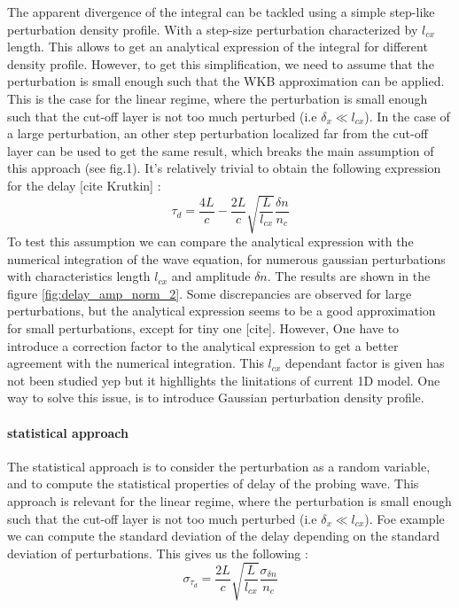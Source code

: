 \documentclass[11pt,a4paper]{report}
\begin{document}
\begin{multicols}{2}
    The apparent divergence of the integral can be tackled using a simple step-like perturbation density profile.
    With a step-size perturbation characterized by $l_{cx}$ length. This allows to get an analytical expression of the integral for different density profile. However, to get this simplification, we need to assume that the perturbation is small enough such that the WKB approximation can be applied.
    This is the case for the linear regime, where the perturbation is small enough such that the cut-off layer is not too much perturbed (i.e $\delta_x \ll l_{cx}$). In the case of a large perturbation, an other step perturbation localized far from the cut-off layer can be used to get the same result, which breaks the main assumption of this approach (see fig.1).
    It's relatively trivial to obtain the following expression for the delay [cite Krutkin] :
    $$\tau_d = \frac{4L}{c} - \frac{2L}{c}\sqrt{\frac{L}{l_{cx}}}\frac{\delta n}{n_c} $$
    To test this assumption we can compare the analytical expression with the numerical integration of the wave equation, for numerous gaussian perturbations with characteristics length $l_{cx}$ and amplitude $\delta n$. The results are shown in the figure \ref{fig:delay_amp_norm_2}. Some discrepancies are observed for large perturbations, but the analytical expression seems to be a good approximation for small perturbations, except for tiny one [cite]. However, One have to introduce a correction
    factor to the analytical expression to get a better agreement with the numerical integration. This $l_{cx}$ dependant factor is given has not been studied yep but it highllights the linitations of current 1D model.
    One way to solve this issue, is to introduce Gaussian perturbation density profile.
    \paragraph{statistical approach}
    The statistical approach is to consider the perturbation as a random variable, and to compute the statistical properties of delay of the probing wave. This approach is relevant for the linear regime, where the perturbation is small enough such that the cut-off layer is not too much perturbed (i.e $\delta_x \ll l_{cx}$). Foe example we can compute the standard deviation of the delay depending on the standard deviation of perturbations.
    This gives us the following :
    $$\sigma_{\tau_d} = \frac{2L}{c}\sqrt{\frac{L}{l_{cx}}}\frac{\sigma_{\delta n}}{n_c}$$

\end{multicols}
\end{document}
